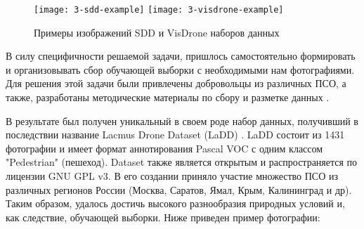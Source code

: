 \begin{figure}[H]
    \centering
    \texttt{[image: 3-sdd-example]}
    \hfill
    \texttt{[image: 3-visdrone-example]}
    \caption{Примеры изображений SDD и VisDrone наборов данных} \label{sdd-visdrone-example}
\end{figure}


В силу специфичности решаемой задачи, пришлось самостоятельно формировать и организовывать сбор обучающей выборки с необходимыми нам фотографиями. Для решения этой задачи были привлечены добровольцы из различных ПСО, а также, разработаны методические материалы по сбору и разметке данных \cite{lib-lacmus-wiki-images}\cite{lib-lacmus-wiki-label}.

В результате был получен уникальный в своем роде набор данных, получивший в последствии название Lacmus Drone Dataset (LaDD) \cite{lib-ladd}. LaDD состоит из 1431 фотографии и имеет формат аннотирования Pascal VOC \cite{lib-pascal} с одним классом "Pedestrian" (пешеход). Dataset также является открытым и распространяется по лицензии GNU GPL v3. В его создании приняло участие множество ПСО из различных регионов России (Москва, Саратов, Ямал, Крым, Калининград и др). Таким образом, удалось достичь высокого разнообразия природных условий и, как следствие, обучающей выборки. Ниже приведен пример фотографии:


\clearpage